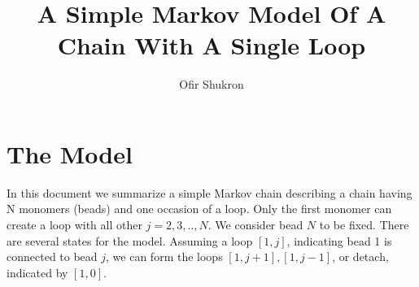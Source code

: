 \documentclass[12pt]{article}
\begin{document}
\title{A Simple Markov Model Of A Chain With A Single Loop}
\author{Ofir Shukron}
\maketitle
\section{The Model}\label{section_theModel}
In this document we summarize a simple Markov chain describing a chain having N monomers (beads) and one occasion of a loop. Only the first monomer can create a loop with all other $j=2,3,..,N$. We consider bead $N$ to be fixed. 
There are several states for the model. Assuming a loop $[1,j]$, indicating bead 1 is connected to bead $j$, we can form the loops $[1,j+1],[1,j-1]$, or detach, indicated by $[1,0]$. 
\end{document}
